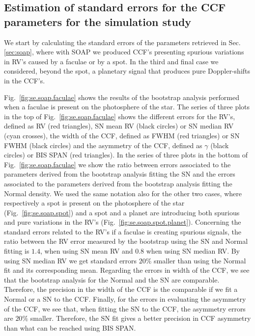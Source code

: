 \documentclass[11pt, oneside]{article}
\begin{document}
\subsection{Estimation of standard errors for the CCF parameters for the simulation study} \label{sec:bootstrap_soap}

We start by calculating the standard errors of the parameters retrieved in Sec. \ref{sec:soap}, where with SOAP we produced CCF's presenting spurious variations in RV's caused by a faculae or by a spot. In the third and final case we considered, beyond the spot, a planetary signal that produces pure Doppler-shifts in the CCF's.

Fig.~\ref{fig:se.soap.faculae} shows the results of the bootstrap analysis performed when a faculae is present on the photosphere of the star. The series of three plots in the top of Fig.~\ref{fig:se.soap.faculae} shows the different errors for the RV's, defined as RV (red triangles), SN mean RV (black circles) or SN median RV (cyan crosses), the width of the CCF, defined as FWHM (red triangles) or SN FWHM (black circles) and the asymmetry of the CCF, defined as $\gamma$ (black circles) or BIS SPAN (red triangles). In the series of three plots in the bottom of Fig.~\ref{fig:se.soap.faculae} we show the ratio between errors associated to the parameters derived from the bootstrap analysis fitting the SN and the errors associated to the parameters derived from the bootstrap analysis fitting the Normal density.  We used the same notation also for the other two cases, where respectively a spot is present on the photosphere of the star (Fig.~\ref{fig:se.soap.spot}) and a spot and a planet are introducing both spurious and pure variations in the RV's (Fig.~\ref{fig:se.soap.spot.planet}). Concerning the standard errors related to the RV's if a faculae is creating spurious signals, the ratio between the RV error measured by the bootstrap using the SN and Normal fitting is $1.4$, when using SN mean RV and $0.8$ when using SN median RV. By using SN median RV we get standard errors $20\%$ smaller than using the Normal fit and its corresponding mean. Regarding the errors in width of the CCF, we see that the bootstrap analysis for the Normal and the SN are comparable. Therefore, the precision in the width of the CCF is the comparable if we fit a Normal or a SN to the CCF. Finally, for the errors in evaluating the asymmetry of the CCF, we see that, when fitting the SN to the CCF, the asymmetry errors are $20\%$ smaller. Therefore, the SN fit gives a better precision in CCF asymmetry than what can be reached using BIS SPAN.
\end{document}

